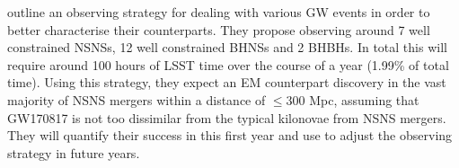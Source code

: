 \documentclass[twocolumn]{aastex631}
\begin{document}
\citet{Andreoni+2022} outline an observing strategy for dealing with various GW events in order to better characterise their counterparts. They propose observing around 7 well constrained NSNSs, 12 well constrained BHNSs and 2 BHBHs. In total this will require around 100 hours of LSST time over the course of a year (1.99\% of total time). Using this strategy, they expect an EM counterpart discovery in the vast majority of NSNS mergers within a distance of $\le$300 Mpc, assuming that GW170817 is not too dissimilar from the typical kilonovae from NSNS mergers. They will quantify their success in this first year and use to adjust the observing strategy in future years.


{}
\end{document}
